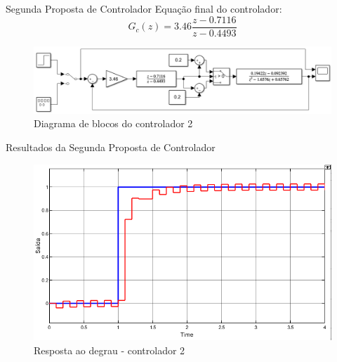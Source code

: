 \documentclass{beamer}
\begin{document}
\begin{frame}{Segunda Proposta de Controlador}
Equação final do controlador:
\begin{equation}
G_{c}(z)=3.46\frac{z - 0.7116}{z - 0.4493}
\label{novogcz}
\end{equation}

\begin{figure}
    \centering
    \includegraphics[width = \linewidth]{src/tex/img/controle_2.PNG}
    \caption{Diagrama de blocos do controlador 2}
    \label{fig:control_2}
\end{figure}
\end{frame}

\begin{frame}{Resultados da Segunda Proposta de Controlador}
\begin{figure}
    \centering
    \includegraphics[width = \linewidth]{src/tex/img/saida_controle_2.png}
    \caption{Resposta ao degrau - controlador 2}
    \label{fig:controler1}
\end{figure}
\end{frame}
\end{document}
